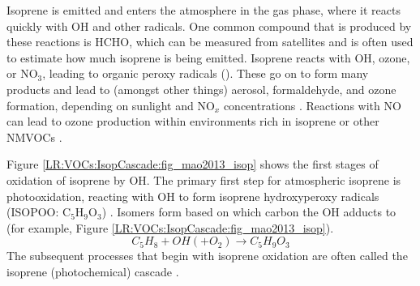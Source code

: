     Isoprene is emitted and enters the atmosphere in the gas phase, where it reacts quickly with OH and other radicals.
    One common compound that is produced by these reactions is HCHO, which can be measured from satellites and is often used to estimate how much isoprene is being emitted.
    Isoprene %
    reacts with OH, ozone, or NO$_3$, leading to organic peroxy radicals (\roo).
    These go on to form many products and lead to (amongst other things) aerosol, formaldehyde, and ozone formation, depending on sunlight and NO$_x$ concentrations \parencite{Atkinson2000}.
    Reactions with NO can lead to ozone production within environments rich in isoprene or other NMVOCs \parencite{Patchen2007,AtkinsonArey2003}.
    
    
    
    Figure \ref{LR:VOCs:IsopCascade:fig_mao2013_isop} shows the first stages of 
    oxidation of isoprene by OH.
    The primary first step for atmospheric isoprene is photooxidation, reacting 
    with OH to form isoprene hydroxyperoxy radicals (ISOPOO: C$_5$H$_9$O$_3$) 
    \parencite{Patchen2007,Wolfe2016,Marvin2017}.
    Isomers form based on which carbon the OH adducts to (for example, Figure 
    \ref{LR:VOCs:IsopCascade:fig_mao2013_isop}).
    \begin{equation} \label{LR:VOCs:IsopCascade:eqn_IsopToIsopoo}
      C_5H_8 + OH (+ O_2) \rightarrow C_5H_9O_3\dot{}
    \end{equation}
    The subsequent processes that begin with isoprene oxidation 
    are often called the isoprene (photochemical) cascade 
    \parencite[e.g.,][]{Crounse2012,Paulot2012,Wolfe2016}.
    
    
    
    
